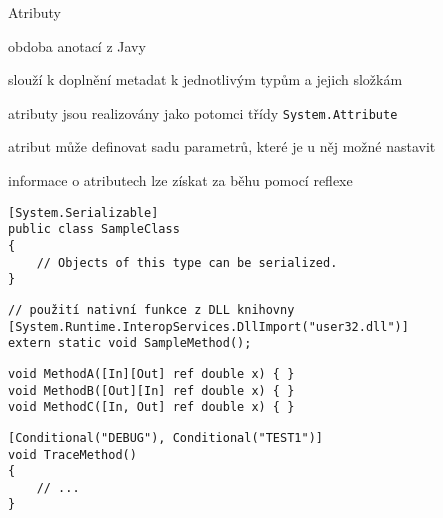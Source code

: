 \nezkouskove


\begin{frame}[fragile]
\vfill
\begin{bitemize}{Atributy}
\item obdoba anotací z Javy
\item slouží k doplnění metadat k jednotlivým typům a jejich složkám
\item atributy jsou realizovány jako potomci třídy \lstinline|System.Attribute|
\item atribut může definovat sadu parametrů, které je u něj možné nastavit
\item informace o atributech lze získat za běhu pomocí reflexe
\end{bitemize}
\vfill
\begin{yesblock}
\begin{lstlisting}
[System.Serializable]  
public class SampleClass  
{  
    // Objects of this type can be serialized.  
}  
\end{lstlisting}
\end{yesblock}
\vfill
\end{frame}


\begin{frame}[fragile]
\vfill
\begin{yesblock}
\begin{lstlisting}
// použití nativní funkce z DLL knihovny
[System.Runtime.InteropServices.DllImport("user32.dll")]  
extern static void SampleMethod();  
\end{lstlisting}
\end{yesblock}
\vfill
\begin{yesblock}
\begin{lstlisting}
void MethodA([In][Out] ref double x) { }  
void MethodB([Out][In] ref double x) { }  
void MethodC([In, Out] ref double x) { }  
\end{lstlisting}
\end{yesblock}
\vfill
\begin{yesblock}
\begin{lstlisting}
[Conditional("DEBUG"), Conditional("TEST1")]  
void TraceMethod()  
{  
    // ...  
}  
\end{lstlisting}
\end{yesblock}
\vfill
\end{frame}



